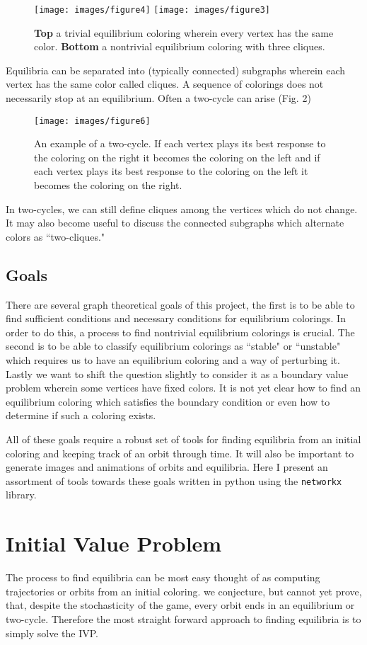 \documentclass[]{article}
\begin{document}
\begin{figure}[h!]
	\texttt{[image: images/figure4]}
	\texttt{[image: images/figure3]}
	\caption{\textbf{Top} a trivial equilibrium coloring wherein every vertex has the same color. \textbf{Bottom} a nontrivial equilibrium coloring with three cliques.}
\end{figure}

Equilibria can be separated into (typically connected) subgraphs wherein each vertex has the same color called cliques. A sequence of colorings does not necessarily stop at an equilibrium. Often a two-cycle can arise (Fig. 2)

\begin{figure}[h!]
	\texttt{[image: images/figure6]}
	\caption{An example of a two-cycle. If each vertex plays its best response to the coloring on the right it becomes the coloring on the left and if each vertex plays its best response to the coloring on the left it becomes the coloring on the right. }
\end{figure}

In two-cycles, we can still define cliques among the vertices which do not change. It may also become useful to discuss the connected subgraphs which alternate colors as ``two-cliques."   
\subsection{Goals}
There are several graph theoretical goals of this project, the first is to be able to find sufficient conditions and necessary conditions for equilibrium colorings. In order to do this, a process to find nontrivial equilibrium colorings is crucial. The second is to be able to classify equilibrium colorings as ``stable" or ``unstable" which requires us to have an equilibrium coloring and a way of perturbing it. Lastly we want to shift the question slightly to consider it as a boundary value problem wherein some vertices have fixed colors. It is not yet clear how to find an equilibrium coloring which satisfies the boundary condition or even how to determine if such a coloring exists. 

All of these goals require a robust set of tools for finding equilibria from an initial coloring and keeping track of an orbit through time. It will also be important to generate images and animations of orbits and equilibria. Here I present an assortment of tools towards these goals written in python using the \verb*|networkx| library. 
\section{Initial Value Problem}
The process to find equilibria can be most easy thought of as computing trajectories or orbits from an initial coloring. we conjecture, but cannot yet prove, that, despite the stochasticity of the game, every orbit ends in an equilibrium or two-cycle. Therefore the most straight forward approach to finding equilibria is to simply solve the IVP. 
\end{document}
